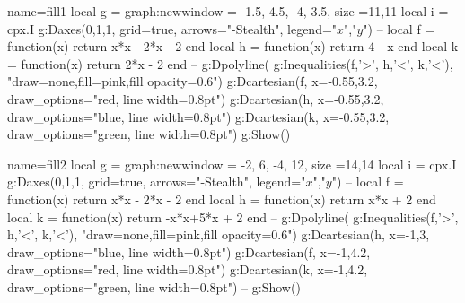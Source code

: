 \documentclass[12pt]{standalone}
\begin{document}
\begin{luadraw}{name=fill1}
local g = graph:new{window = {-1.5, 4.5, -4, 3.5}, size ={11,11}}
local i = cpx.I 
g:Daxes({0,1,1}, {grid=true, arrows="-Stealth", legend={"$x$","$y$"}})
--
local f = function(x) return x*x - 2*x - 2 end
local h = function(x) return 4 - x end
local k = function(x) return 2*x - 2 end 
--
g:Dpolyline( g:Inequalities(f,'>', h,'<', k,'<'), "draw=none,fill=pink,fill opacity=0.6")
g:Dcartesian(f, {x={-0.55,3.2}, draw_options="red, line width=0.8pt"})
g:Dcartesian(h, {x={-0.55,3.2}, draw_options="blue, line width=0.8pt"})
g:Dcartesian(k, {x={-0.55,3.2}, draw_options="green, line width=0.8pt"})
g:Show()
\end{luadraw}

\begin{luadraw}{name=fill2}
local g = graph:new{window = {-2, 6, -4, 12}, size ={14,14}}
local i = cpx.I 
g:Daxes({0,1,1}, {grid=true, arrows="-Stealth", legend={"$x$","$y$"}})
--
local f = function(x) return x*x - 2*x - 2 end
local h = function(x) return x*x + 2 end
local k = function(x) return -x*x+5*x + 2 end
--
g:Dpolyline( g:Inequalities(f,'>', h,'<', k,'<'), "draw=none,fill=pink,fill opacity=0.6")
g:Dcartesian(h, {x={-1,3}, draw_options="blue, line width=0.8pt"})
g:Dcartesian(f, {x={-1,4.2}, draw_options="red, line width=0.8pt"})
g:Dcartesian(k, {x={-1,4.2}, draw_options="green, line width=0.8pt"})
--
g:Show()
\end{luadraw}
\end{document}
